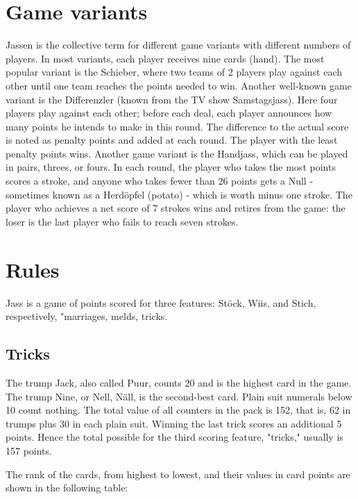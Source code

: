 \section{Game variants}
Jassen is the collective term for different game variants with different numbers of players. In most variants, each player receives nine cards (hand).
The most popular variant is the Schieber, where two teams of 2 players play against each other until one team reaches the points needed to win.
Another well-known game variant is the Differenzler (known from the TV show Samstagsjass). Here four players play against each other; before each deal, each player announces how many points he intends to make in this round. The difference to the actual score is noted as penalty points and added at each round. The player with the least penalty points wins.
Another game variant is the Handjass, which can be played in pairs, threes, or fours. In each round, the player who takes the most points scores a stroke, and anyone who takes fewer than 26 points gets a Null - sometimes known as a Herdöpfel (potato) - which is worth minus one stroke. The player who achieves a net score of 7 strokes wins and retires from the game: the loser is the last player who fails to reach seven strokes. \cite{handjass}\\

\section{Rules \cite{jass}}
Jass is a game of points scored for three features: Stöck, Wiis, and Stich, respectively, "marriages, melds, tricks.


\subsection{Tricks}

The trump Jack, also called Puur, counts 20 and is the highest card in the game. The trump Nine, or Nell, Näll, is the second-best card. Plain suit numerals below 10 count nothing. The total value of all counters in the pack is 152, that is, 62 in trumps plus 30 in each plain suit. Winning the last trick scores an additional 5 points. Hence the total possible for the third scoring feature, "tricks," usually is 157 points.

The rank of the cards, from highest to lowest, and their values in card points are shown in the following table:

